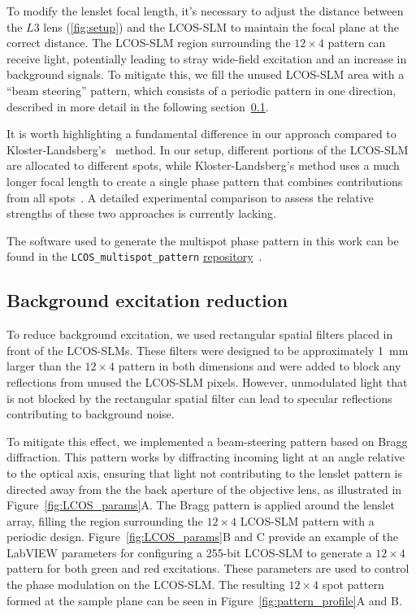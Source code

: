 To modify the lenslet focal length, it's necessary to adjust the distance between the $L3$ lens (\ref{fig:setup}) and the \ac{LCOS-SLM} to maintain the focal plane at the correct distance. 
The \ac{LCOS-SLM} region surrounding the $12\times4$ pattern can receive light, potentially leading to stray wide-field excitation and an increase in background signals. 
To mitigate this, we fill the unused \ac{LCOS-SLM} area with a \enquote{beam steering} pattern, which consists of a periodic pattern in one direction, described in more detail in the following section~\ref{sec:background_suppression}. 

It is worth highlighting a fundamental difference in our approach compared to Kloster-Landsberg's~\cite{kloster-landsberg_RSI_2013} method. 
In our setup, different portions of the \ac{LCOS-SLM} are allocated to different spots, while Kloster-Landsberg's method uses a much longer focal length to create a single phase pattern that combines contributions from all spots~\cite{kloster-landsberg_RSI_2013}. 
A detailed experimental comparison to assess the relative strengths of these two approaches is currently lacking.

The software used to generate the multispot phase pattern in this work can be found in the \texttt{LCOS\_multispot\_pattern} \href{https://github.com/ multispot-software}{repository}~\cite{ingargiola_JCP_2018}.

\subsection{Background excitation reduction}
\label{sec:background_suppression}

To reduce background excitation, we used rectangular spatial filters placed in front of the \ac{LCOS-SLM}s. 
These filters were designed to be approximately 1~mm larger than the $12\times4$ pattern in both dimensions and were added to block any reflections from unused the \ac{LCOS-SLM} pixels.
However, unmodulated light that is not blocked by the rectangular spatial filter can lead to specular reflections contributing to background noise.

To mitigate this effect, we implemented a beam-steering pattern based on Bragg diffraction. 
This pattern works by diffracting incoming light at an angle relative to the optical axis, ensuring that light not contributing to the lenslet pattern is directed away from the the back aperture of the objective lens, as illustrated in Figure~\ref{fig:LCOS_params}A.
The Bragg pattern is applied around the lenslet array, filling the region surrounding the $12\times4$ \ac{LCOS-SLM} pattern with a periodic design. 
Figure~\ref{fig:LCOS_params}B and C provide an example of the LabVIEW parameters for configuring a 255-bit \ac{LCOS-SLM} to generate a $12\times4$ pattern for both green and red excitations.
These parameters are used to control the phase modulation on the \ac{LCOS-SLM}.
The resulting $12\times4$ spot pattern formed at the sample plane can be seen in Figure~\ref{fig:pattern_profile}A and B.

